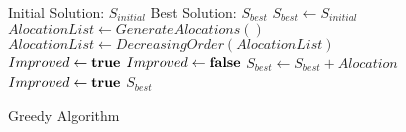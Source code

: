 \begin{figure}

\begin{algorithmic}[1]
\REQUIRE Initial Solution: $S_{initial}$
\ENSURE Best Solution: $S_{best}$
\STATE $S_{best} \gets S_{initial}$ 
\STATE $AlocationList \gets GenerateAlocations()$
  \label{alg:galp:gera}
\STATE $AlocationList \gets DecreasingOrder(AlocationList)$
  \label{alg:galp:ordena}
\STATE $Improved \gets \textbf{true}{}$ 
  \label{alg:galp:inicioloop}
  \STATE $Improved \gets \textbf{false}{}$
    \label{alg:galp:inicioloopinterno}
      \STATE $S_{best} \gets S_{best} + Alocation$
	    \label{alg:galp:melhoria}
      \STATE $Improved \gets \textbf{true}{}$ 
    \ENDIF
  \ENDFOR
  \label{alg:galp:fimloopinterno}
\ENDWHILE
\label{alg:galp:fimloop}
\RETURN $S_{best}$
\end{algorithmic}

\caption{Greedy Algorithm}
\label{alg:galp}
\end{figure}
